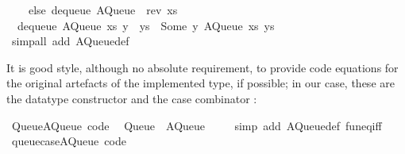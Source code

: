 \begin{isabellebody}
\ \ \ \ else\ dequeue\ {}AQueue\ {}{}\ {}rev\ xs{}{}{}{}\isanewline
\ \ {}dequeue\ {}AQueue\ xs\ {}y\ {}\ ys{}{}\ {}\ {}Some\ y{}\ AQueue\ xs\ ys{}{}\isanewline
\ \ \isamarkupfalse%
\ {}simp{}all\ add{}\ AQueue{}def{}%
\endisatagquote
{\isafoldquote}%
%
\isadelimquote
%
\endisadelimquote
%
\begin{isamarkuptext}%
\noindent It is good style, although no absolute requirement, to
  provide code equations for the original artefacts of the implemented
  type, if possible; in our case, these are the datatype constructor
   and the case combinator :%
\end{isamarkuptext}%
\isamarkuptrue%
%
\isadelimquote
%
\endisadelimquote
%
\isatagquote
{}\isamarkupfalse%
\ Queue{}AQueue\ {}code{}{}\isanewline
\ \ {}Queue\ {}\ AQueue\ {}{}{}\isanewline
\ \ \isamarkupfalse%
\ {}simp\ add{}\ AQueue{}def\ fun{}eq{}iff{}\isanewline
\isanewline
{}\isamarkupfalse%
\ queue{}case{}AQueue\ {}code{}{}\isanewline

\end{isabellebody}
